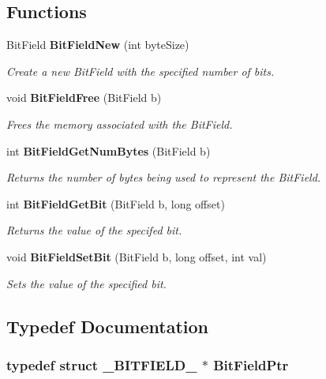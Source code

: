 \subsection*{Functions}
\begin{CompactItemize}
\item 
Bit\-Field {\bf Bit\-Field\-New} (int byte\-Size)
\begin{CompactList}\small\item\em Create a new Bit\-Field with the specified number of bits. \item\end{CompactList}\item 
void {\bf Bit\-Field\-Free} (Bit\-Field b)
\begin{CompactList}\small\item\em Frees the memory associated with the Bit\-Field. \item\end{CompactList}\item 
int {\bf Bit\-Field\-Get\-Num\-Bytes} (Bit\-Field b)
\begin{CompactList}\small\item\em Returns the number of bytes being used to represent the Bit\-Field. \item\end{CompactList}\item 
int {\bf Bit\-Field\-Get\-Bit} (Bit\-Field b, long offset)
\begin{CompactList}\small\item\em Returns the value of the specifed bit. \item\end{CompactList}\item 
void {\bf Bit\-Field\-Set\-Bit} (Bit\-Field b, long offset, int val)
\begin{CompactList}\small\item\em Sets the value of the specified bit. \item\end{CompactList}\end{CompactItemize}


\subsection{Typedef Documentation}
\subsubsection{\setlength{\rightskip}{0pt plus 5cm}typedef struct {\bf \_\-BITFIELD\_\-} $\ast$ {\bf Bit\-Field\-Ptr}}\label{bitfield_8h_a1}


